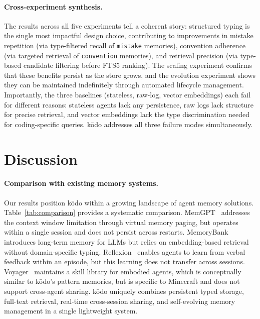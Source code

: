 \documentclass{article}
\begin{document}
\paragraph{Cross-experiment synthesis.} The results across all five experiments tell a coherent story: structured typing is the single most impactful design choice, contributing to improvements in mistake repetition (via type-filtered recall of \texttt{mistake} memories), convention adherence (via targeted retrieval of \texttt{convention} memories), and retrieval precision (via type-based candidate filtering before FTS5 ranking). The scaling experiment confirms that these benefits persist as the store grows, and the evolution experiment shows they can be maintained indefinitely through automated lifecycle management. Importantly, the three baselines (stateless, raw-log, vector embeddings) each fail for different reasons: stateless agents lack any persistence, raw logs lack structure for precise retrieval, and vector embeddings lack the type discrimination needed for coding-specific queries. k\=odo addresses all three failure modes simultaneously.

\section{Discussion}

\paragraph{Comparison with existing memory systems.} Our results position k\=odo within a growing landscape of agent memory solutions. Table~\ref{tab:comparison} provides a systematic comparison. MemGPT~\cite{packer2023memgpt} addresses the context window limitation through virtual memory paging, but operates within a single session and does not persist across restarts. MemoryBank~\cite{zhong2024memorybank} introduces long-term memory for LLMs but relies on embedding-based retrieval without domain-specific typing. Reflexion~\cite{shinn2023reflexion} enables agents to learn from verbal feedback within an episode, but this learning does not transfer across sessions. Voyager~\cite{wang2024voyager} maintains a skill library for embodied agents, which is conceptually similar to k\=odo's pattern memories, but is specific to Minecraft and does not support cross-agent sharing. k\=odo uniquely combines persistent typed storage, full-text retrieval, real-time cross-session sharing, and self-evolving memory management in a single lightweight system.
\end{document}
